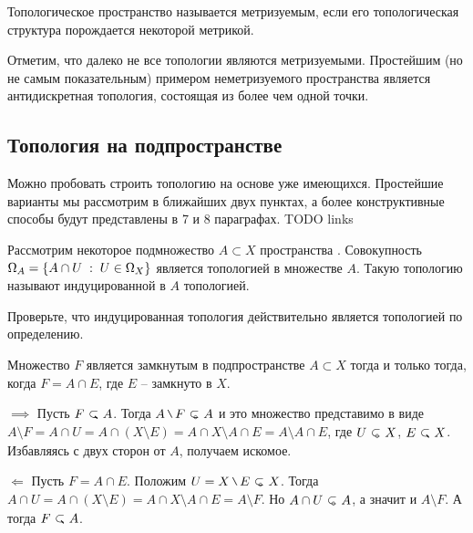    \begin{Def}
       Топологическое пространство называется метризуемым, если его топологическая структура порождается некоторой метрикой.
   \end{Def}

   \begin{Note}
       Отметим, что далеко не все топологии являются метризуемыми. Простейшим (но не самым показательным) примером неметризуемого пространства является антидискретная топология, состоящая из более чем одной точки.
   \end{Note}
   \subsection{Топология на подпространстве}
   Можно пробовать строить топологию на основе уже имеющихся. Простейшие варианты мы рассмотрим в ближайших двух пунктах, а более конструктивные способы будут представлены в 7 и 8 параграфах. TODO links
   \begin{Def}
   Рассмотрим некоторое подмножество $A\subset X$ пространства \topX. Совокупность  $\Omega_A = \left\{ A \cap U \; : \; U \in \Omega_X \right\}$ является топологией в множестве $A$. Такую топологию называют индуцированной в $A$ топологией.
   \end{Def}
    \begin{Task}
        Проверьте, что индуцированная топология действительно является топологией по определению.
    \end{Task}

    \begin{Prop}
        Множество $F$ является замкнутым в подпространстве $A\subset X$ тогда и только тогда, когда $F = A \cap E$, где $E$ -- замкнуто в $X$.
    \end{Prop}
    \begin{Proof}
        $\implies$ Пусть $F \closed A$. Тогда $A\setminus F \open A$ и это  множество представимо в виде $A \setminus F = A \cap U = A \cap (X \setminus E) = A \cap X \setminus A \cap E = A \setminus A\cap E$, где $U \open X$, $E \closed X$. Избавляясь с двух сторон от $A$, получаем искомое.

        $\Longleftarrow$ Пусть $F = A\cap E$. Положим $U = X \setminus E \open X$. Тогда $A \cap U = A \cap (X\setminus E) = A\cap X \setminus A \cap E = A \setminus F$. Но $A \cap U \open A$, а значит и $A \setminus F$. А тогда $F \closed A$.
    \end{Proof}
    
